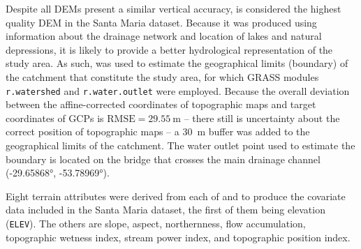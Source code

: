 

Despite all DEMs present a similar vertical accuracy, \demNew{} is considered the highest quality DEM in the 
Santa Maria dataset. Because it was produced using information about the drainage network and location of lakes 
and natural depressions, it is likely to provide a better hydrological representation of the study area. As 
such, \demNew{} was used to estimate the geographical limits (boundary) of the catchment that constitute the 
study area, for which GRASS modules \texttt{r.watershed} and 
\texttt{r.water.outlet} were employed. Because the overall deviation between the affine-corrected coordinates 
of topographic maps and target coordinates of GCPs is $\text{RMSE} = \SI{29.55}{\m}$ -- there still is 
uncertainty about the correct position of topographic maps -- a \SI{30}{\m} buffer was added to the 
geographical limits of the catchment. The water outlet point used to estimate the boundary is located on the 
bridge that crosses the main drainage channel (\ang{-29.65868}, \ang{-53.78969}).

Eight terrain attributes were derived from each of \demOld{} and \demNew{} to produce the covariate data 
included in the Santa Maria dataset, the first of them being elevation (\texttt{ELEV}). The others are slope, 
aspect, northernness, flow accumulation, topographic wetness index, stream power index, and topographic 
position index.

